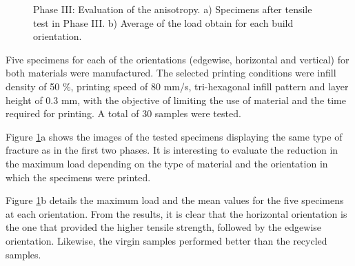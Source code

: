 \documentclass[
  12pt]{article}
\begin{document}
\begin{figure}[!h]

{\centering {}

}

\caption{Phase III: Evaluation of the anisotropy. a) Specimens after tensile test in  Phase III. b) Average of the load obtain for each build orientation.}\label{fig:phase3}
\end{figure}

Five specimens for each of the orientations (edgewise, horizontal and vertical) for both materials were manufactured.
The selected printing conditions were infill density of 50 \%, printing speed of 80 mm/s, tri-hexagonal infill pattern and layer height of 0.3 mm, with the objective of limiting the use of material and the time required for printing.
A total of 30 samples were tested.

Figure \ref{fig:phase3}a shows the images of the tested specimens displaying the same type of fracture as in the first two phases.
It is interesting to evaluate the reduction in the maximum load depending on the type of material and the orientation in which the specimens were printed.

Figure \ref{fig:phase3}b details the maximum load and the mean values for the five specimens at each orientation.
From the results, it is clear that the horizontal orientation is the one that provided the higher tensile strength, followed by the edgewise orientation.
Likewise, the virgin samples performed better than the recycled samples.
\end{document}
